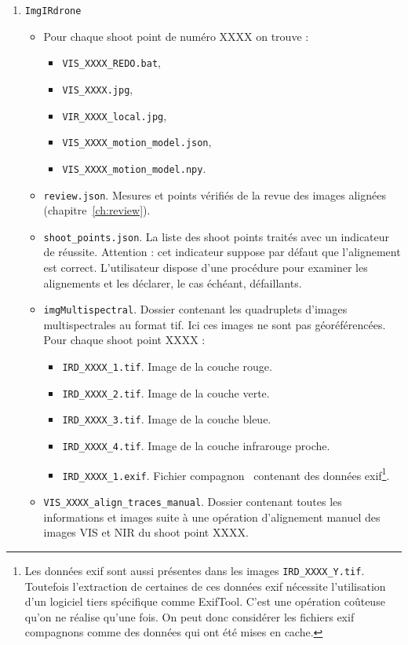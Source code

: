 \documentclass[a4paper,11pt]{report}
\begin{document}
\begin{enumerate}
	\item \texttt{ImgIRdrone}
		\begin{itemize}
		\item Pour chaque shoot point de numéro XXXX on trouve : 
			\begin{itemize}
				\item \texttt{VIS\_XXXX\_REDO.bat},
				\item \texttt{VIS\_XXXX.jpg},
				\item \texttt{VIR\_XXXX\_local.jpg},
				\item \texttt{VIS\_XXXX\_motion\_model.json},
				\item \texttt{VIS\_XXXX\_motion\_model.npy}.
			\end{itemize}
		\item \texttt{review.json}. Mesures et points vérifiés de la revue des images alignées (chapitre~\ref{ch:review}).
		\item \texttt{shoot\_points.json}. La liste des shoot points traités avec un indicateur de réussite. Attention : cet indicateur suppose par défaut que l'alignement est correct. L'utilisateur dispose d'une procédure pour examiner les alignements et les déclarer, le cas échéant, défaillants.
		\item \texttt{imgMultispectral}. Dossier contenant les quadruplets d'images multispectrales au format tif. Ici ces images ne sont pas géoréférencées. Pour chaque shoot point XXXX :
			\begin{itemize}
				\item \texttt{IRD\_XXXX\_1.tif}. Image de la couche rouge. 
				\item \texttt{IRD\_XXXX\_2.tif}. Image de la couche verte.
				\item \texttt{IRD\_XXXX\_3.tif}. Image de la couche bleue.
				\item \texttt{IRD\_XXXX\_4.tif}. Image de la couche infrarouge proche.
				\item \texttt{IRD\_XXXX\_1.exif}. Fichier \og compagnon \fg~contenant des données exif\footnote{Les données exif sont aussi présentes dans les images \texttt{IRD\_XXXX\_Y.tif}. Toutefois l'extraction de certaines de ces données exif nécessite l'utilisation d'un logiciel tiers spécifique comme ExifTool. C'est une opération coûteuse qu'on ne réalise qu'une fois. On peut donc considérer les fichiers exif compagnons comme des données qui ont été mises en cache.}.
			\end{itemize}
		\item \texttt{VIS\_XXXX\_align\_traces\_manual}. Dossier contenant toutes les informations et images suite à une opération d'alignement manuel des images VIS et NIR du shoot point XXXX.

\end{itemize}
\end{enumerate}
\end{document}
